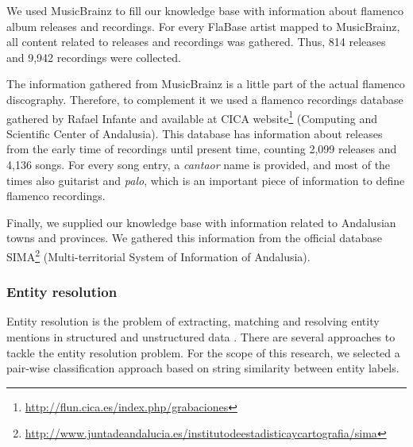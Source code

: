 We used MusicBrainz to fill our knowledge base with information about flamenco album releases and recordings. %
For every FlaBase artist mapped to MusicBrainz, all content related to releases and recordings was gathered. Thus, 814 releases and 9,942 recordings were collected. 

The information gathered from MusicBrainz is a little part of the actual flamenco discography. Therefore, to complement it we used a flamenco recordings database gathered by Rafael Infante and available at CICA website\footnote{\url{http://flun.cica.es/index.php/grabaciones}} (Computing and Scientific Center of Andalusia). This database has information about releases from the early time of recordings until present time, counting 2,099 releases and 4,136 songs. For every song entry, a \textit{cantaor} name is provided, and most of the times also guitarist and \textit{palo}, which is an important piece of information to define flamenco recordings.

Finally, we supplied our knowledge base with information related to Andalusian towns and provinces. We gathered this information from the official database SIMA\footnote{\url{http://www.juntadeandalucia.es/institutodeestadisticaycartografia/sima}} (Multi-territorial System of Information of Andalusia).%


\subsubsection{Entity resolution}
\label{sec:musicology:entity_resolution}

Entity resolution is the problem of extracting, matching and resolving entity mentions in structured and unstructured data \citep{Getoor2012}. There are several approaches to tackle the entity resolution problem. For the scope of this research, we selected a pair-wise classification approach based on string similarity between entity labels.


